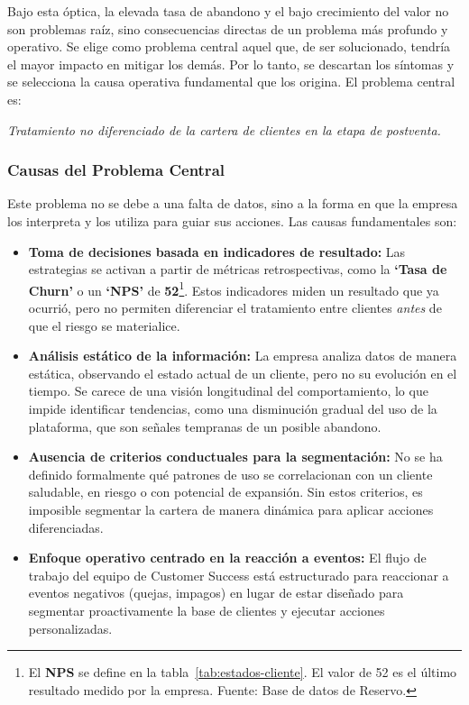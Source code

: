 Bajo esta óptica, la elevada tasa de abandono y el bajo crecimiento del valor no son problemas raíz, sino consecuencias directas de un problema más profundo y operativo. Se elige como problema central aquel que, de ser solucionado, tendría el mayor impacto en mitigar los demás. Por lo tanto, se descartan los síntomas y se selecciona la causa operativa fundamental que los origina. El problema central es:

\begin{center}
    \textit{Tratamiento no diferenciado de la cartera de clientes en la etapa de postventa.}
\end{center}

\subsubsection{Causas del Problema Central}
Este problema no se debe a una falta de datos, sino a la forma en que la empresa los interpreta y los utiliza para guiar sus acciones. Las causas fundamentales son:

\begin{itemize}
    \item \textbf{Toma de decisiones basada en indicadores de resultado:} Las estrategias se activan a partir de métricas retrospectivas, como la \textbf{`Tasa de Churn'} o un \textbf{`NPS'} de \textbf{52}\footnote{El \textbf{NPS} se define en la tabla~\ref{tab:estados-cliente}. El valor de 52 es el último resultado medido por la empresa. Fuente: Base de datos de Reservo.}. Estos indicadores miden un resultado que ya ocurrió, pero no permiten diferenciar el tratamiento entre clientes \textit{antes} de que el riesgo se materialice.

    \item \textbf{Análisis estático de la información:} La empresa analiza datos de manera estática, observando el estado actual de un cliente, pero no su evolución en el tiempo. Se carece de una visión longitudinal del comportamiento, lo que impide identificar tendencias, como una disminución gradual del uso de la plataforma, que son señales tempranas de un posible abandono.

    \item \textbf{Ausencia de criterios conductuales para la segmentación:} No se ha definido formalmente qué patrones de uso se correlacionan con un cliente saludable, en riesgo o con potencial de expansión. Sin estos criterios, es imposible segmentar la cartera de manera dinámica para aplicar acciones diferenciadas.

    \item \textbf{Enfoque operativo centrado en la reacción a eventos:} El flujo de trabajo del equipo de Customer Success está estructurado para reaccionar a eventos negativos (quejas, impagos) en lugar de estar diseñado para segmentar proactivamente la base de clientes y ejecutar acciones personalizadas.
\end{itemize}

